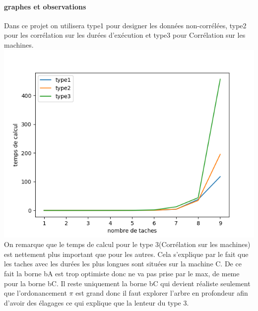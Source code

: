 \documentclass[a4paper, 10pt]{article}
\begin{document}
                \paragraph{graphes et observations}{

                  Dans ce projet on utilisera type1 pour designer les données non-corrélées, type2 pour les corrélation sur les durées d'exécution et type3 pour Corrélation sur les machines.\\

                  \includegraphics{graphes/exacte_b1.png}
                  On remarque que le temps de calcul pour le type 3(Corrélation sur les machines) est nettement plus important que pour les autres. Cela s'explique par le fait que les taches avec les durées les plus longues sont situées sur la machine C. De ce fait la borne bA est trop optimiste donc ne va pas prise par le max, de meme pour la borne bC. Il reste uniquement la borne bC qui devient réaliste seulement que l'ordonancement $\pi$ est grand donc il faut explorer l'arbre en profondeur afin d'avoir des élagages ce qui explique que la lenteur du type 3.
                  
                }
\end{document}
